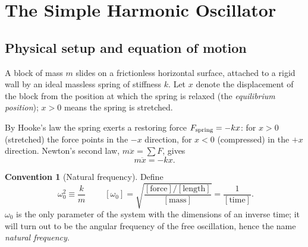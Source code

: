 \documentclass[11pt]{article}
\theoremstyle{plain}
\theoremstyle{definition}
\newtheorem{convention}[lemma]{Convention}
\theoremstyle{remark}
\begin{document}
\section{The Simple Harmonic Oscillator}

\subsection{Physical setup and equation of motion}

A block of mass $m$ slides on a frictionless horizontal surface, attached to a
rigid wall by an ideal massless spring of stiffness $k$. Let $x$ denote the
displacement of the block from the position at which the spring is relaxed
(the \emph{equilibrium position}); $x>0$ means the spring is stretched.

\begin{center}
\end{center}

By Hooke's law the spring exerts a restoring force $F_{\rm spring} = -kx$: for
$x>0$ (stretched) the force points in the $-x$ direction, for $x<0$
(compressed) in the $+x$ direction. Newton's second law, $m\ddot x = \sum F$,
gives
\begin{equation}
  m\ddot x = -kx .
  \label{eq:sho-newton}
\end{equation}

\begin{convention}[Natural frequency]\label{conv:w0}
Define
\begin{equation}
  \boxed{\;\omega_0^2 \equiv \frac{k}{m}\;}
  \qquad [\omega_0] = \sqrt{\frac{[\text{force}]/[\text{length}]}{[\text{mass}]}}
  = \frac{1}{[\text{time}]} .
\end{equation}
$\omega_0$ is the only parameter of the system with the dimensions of an
inverse time; it will turn out to be the angular frequency of the free
oscillation, hence the name \emph{natural frequency}.
\end{convention}
\end{document}
